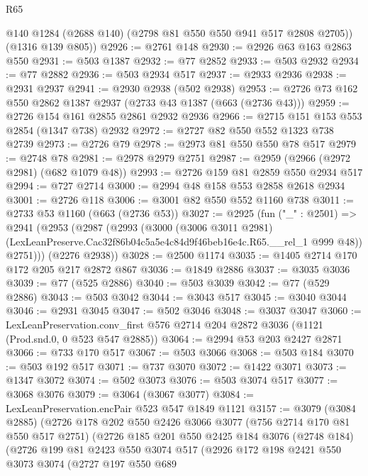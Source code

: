 \begin{lexlean}{R65}
\begin{coremodule}
        @140
        @1284
        (@2688 @140)
        (@2798 @81 @550 @550 @941 @517 @2808 @2705))
      (@1316 @139 @805))
@2926 := @2761 @148
@2930 := @2926 @63 @163 @2863 @550
@2931 := @503 @1387
@2932 := @77 @2852
@2933 := @503 @2932
@2934 := @77 @2882
@2936 := @503 @2934 @517
@2937 := @2933 @2936
@2938 := @2931 @2937
@2941 := @2930 @2938 (@502 @2938)
@2953 := @2726 @73 @162 @550 @2862 @1387 @2937 (@2733 @43 @1387 (@663 (@2736 @43)))
@2959 := @2726 @154 @161 @2855 @2861 @2932 @2936
@2966 := @2715 @151 @153 @553 @2854 (@1347 @738) @2932
@2972 := @2727 @82 @550 @552 @1323 @738 @2739
@2973 := @2726 @79
@2978 := @2973 @81 @550 @550 @78 @517
@2979 := @2748 @78
@2981 := @2978 @2979 @2751
@2987 := @2959 (@2966 (@2972 @2981) (@682 @1079 @48))
@2993 := @2726 @159 @81 @2859 @550 @2934 @517
@2994 := @727 @2714
@3000 := @2994 @48 @158 @553 @2858 @2618 @2934
@3001 := @2726 @118
@3006 := @3001 @82 @550 @552 @1160 @738
@3011 := @2733 @53 @1160 (@663 (@2736 @53))
@3027 := @2925
    (fun ("_" : @2501) =>
    @2941
      (@2953
        (@2987
          (@2993
            (@3000
              (@3006 @3011 @2981)
              (LexLeanPreserve.Cac32f86b04c5a5e4c84d9f46beb16e4c.R65.__rel_1 @999 @48))
            @2751)))
      (@2276 @2938))
@3028 := @2500 @1174
@3035 := @1405 @2714 @170 @172 @205 @217 @2872 @867
@3036 := @1849 @2886
@3037 := @3035 @3036
@3039 := @77 (@525 @2886)
@3040 := @503 @3039
@3042 := @77 (@529 @2886)
@3043 := @503 @3042
@3044 := @3043 @517
@3045 := @3040 @3044
@3046 := @2931 @3045
@3047 := @502 @3046
@3048 := @3037 @3047
@3060 := LexLeanPreservation.conv_first
    @576
    @2714
    @204
    @2872
    @3036
    (@1121 (Prod.snd.{0, 0} @523 @547 @2885))
@3064 := @2994 @53 @203 @2427 @2871
@3066 := @733 @170 @517
@3067 := @503 @3066
@3068 := @503 @184
@3070 := @503 @192 @517
@3071 := @737 @3070
@3072 := @1422 @3071
@3073 := @1347 @3072
@3074 := @502 @3073
@3076 := @503 @3074 @517
@3077 := @3068 @3076
@3079 := @3064 (@3067 @3077)
@3084 := LexLeanPreservation.encPair @523 @547 @1849 @1121
@3157 := @3079
    (@3084 @2885)
    (@2726
      @178
      @202
      @550
      @2426
      @3066
      @3077
      (@756 @2714 @170 @81 @550 @517 @2751)
      (@2726
        @185
        @201
        @550
        @2425
        @184
        @3076
        (@2748 @184)
        (@2726
          @199
          @81
          @2423
          @550
          @3074
          @517
          (@2926
            @172
            @198
            @2421
            @550
            @3073
            @3074
            (@2727
              @197
              @550
              @689

\end{coremodule}
\end{lexlean}
